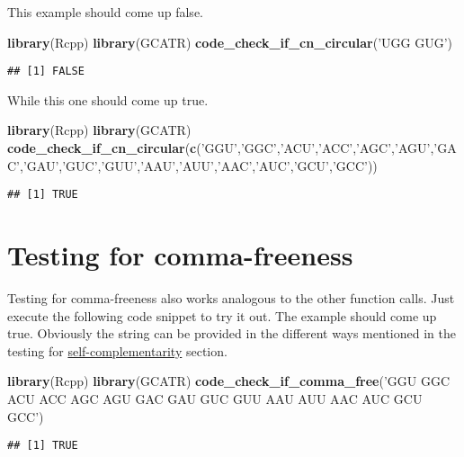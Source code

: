 \documentclass[
]{article}
\newenvironment{Shaded}{\begin{snugshade}}{\end{snugshade}}
\newcommand{\KeywordTok}[1]{\textcolor[rgb]{0.13,0.29,0.53}{\textbf{#1}}}
\newcommand{\NormalTok}[1]{#1}
\newcommand{\StringTok}[1]{\textcolor[rgb]{0.31,0.60,0.02}{#1}}
\begin{document}
This example should come up false.

\begin{Shaded}
\begin{Highlighting}[]
\KeywordTok{library}\NormalTok{(Rcpp)}
\KeywordTok{library}\NormalTok{(GCATR)}
\KeywordTok{code_check_if_cn_circular}\NormalTok{(}\StringTok{'UGG GUG'}\NormalTok{)}
\end{Highlighting}
\end{Shaded}

\begin{verbatim}
## [1] FALSE
\end{verbatim}

While this one should come up true.

\begin{Shaded}
\begin{Highlighting}[]
\KeywordTok{library}\NormalTok{(Rcpp)}
\KeywordTok{library}\NormalTok{(GCATR)}
\KeywordTok{code_check_if_cn_circular}\NormalTok{(}\KeywordTok{c}\NormalTok{(}\StringTok{'GGU'}\NormalTok{,}\StringTok{'GGC'}\NormalTok{,}\StringTok{'ACU'}\NormalTok{,}\StringTok{'ACC'}\NormalTok{,}\StringTok{'AGC'}\NormalTok{,}\StringTok{'AGU'}\NormalTok{,}\StringTok{'GAC'}\NormalTok{,}\StringTok{'GAU'}\NormalTok{,}\StringTok{'GUC'}\NormalTok{,}\StringTok{'GUU'}\NormalTok{,}\StringTok{'AAU'}\NormalTok{,}\StringTok{'AUU'}\NormalTok{,}\StringTok{'AAC'}\NormalTok{,}\StringTok{'AUC'}\NormalTok{,}\StringTok{'GCU'}\NormalTok{,}\StringTok{'GCC'}\NormalTok{))}
\end{Highlighting}
\end{Shaded}

\begin{verbatim}
## [1] TRUE
\end{verbatim}

\hypertarget{testing-for-comma-freeness}{%
\section{Testing for comma-freeness}\label{testing-for-comma-freeness}}

Testing for comma-freeness also works analogous to the other function
calls. Just execute the following code snippet to try it out. The
example should come up true. Obviously the string can be provided in the
different ways mentioned in the testing for
\protect\hyperlink{self-complementary}{self-complementarity} section.

\begin{Shaded}
\begin{Highlighting}[]
\KeywordTok{library}\NormalTok{(Rcpp)}
\KeywordTok{library}\NormalTok{(GCATR)}
\KeywordTok{code_check_if_comma_free}\NormalTok{(}\StringTok{'GGU GGC ACU ACC AGC AGU GAC GAU GUC GUU AAU AUU AAC AUC GCU GCC'}\NormalTok{)}
\end{Highlighting}
\end{Shaded}

\begin{verbatim}
## [1] TRUE
\end{verbatim}
\end{document}
